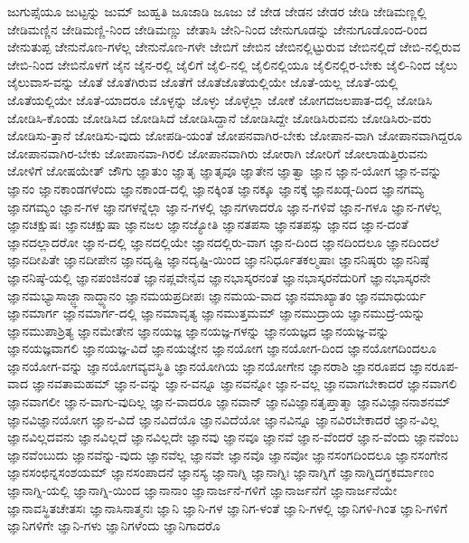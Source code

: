 {ಜುಗುಪ್ಸೆಯೂ
ಜುಟ್ಟನ್ನು
ಜುಮ್
ಜುಹ್ವತಿ
ಜೂಜಾಡಿ
ಜೂಜು
ಜೆ
ಜೇಡ
ಜೇಡನ
ಜೇಡರ
ಜೇಡಿ
ಜೇಡಿಮಣ್ಣಲ್ಲಿ
ಜೇಡಿಮಣ್ಣಿನ
ಜೇಡಿಮಣ್ಣಿ-ನಿಂದ
ಜೇಡಿಮಣ್ಣು
ಜೇತಾಸಿ
ಜೇನಿ-ನಿಂದ
ಜೇನುಗೂಡನ್ನು
ಜೇನುಗೂಡೊಂದ-ರಿಂದ
ಜೇನುತುಪ್ಪ
ಜೇನುನೊಣ-ಗಳೆಲ್ಲ
ಜೇನುನೊಣ-ಗಳೇ
ಜೇಬಿಗೆ
ಜೇಬಿನ
ಜೇಬಿನಲ್ಲಿಟ್ಟುರುವ
ಜೇಬಿನಲ್ಲಿದೆ
ಜೇಬಿ-ನಲ್ಲಿರುವ
ಜೇಬಿ-ನಿಂದ
ಜೇಬಿನೊಳಗೆ
ಜೈನ
ಜೈನ-ರಲ್ಲಿ
ಜೈಲಿಗೆ
ಜೈಲಿ-ನಲ್ಲಿ
ಜೈಲಿನಲ್ಲಿಯೂ
ಜೈಲಿನಲ್ಲಿರ-ಬೇಕು
ಜೈಲಿ-ನಿಂದ
ಜೈಲು
ಜೈಲುವಾಸ-ವನ್ನು
ಜೊತೆ
ಜೊತೆಗಿರುವ
ಜೊತೆಗೆ
ಜೊತೆಜೊತೆಯಲ್ಲಿಯೇ
ಜೊತೆ-ಯಲ್ಲ
ಜೊತೆ-ಯಲ್ಲಿ
ಜೊತೆಯಲ್ಲಿಯೇ
ಜೊತೆ-ಯಾದರೂ
ಜೊಳ್ಳನ್ನು
ಜೊಳ್ಳು
ಜೊಳ್ಳೆಲ್ಲಾ
ಜೋಕೆ
ಜೋಗದಜಲಪಾತ-ದಲ್ಲಿ
ಜೋಡಿಸಿ
ಜೋಡಿಸಿ-ಕೊಂಡು
ಜೋಡಿಸಿದ
ಜೋಡಿಸಿದೆ
ಜೋಡಿಸಿದ್ದಾನೆ
ಜೋಡಿಸಿದ್ದೇ
ಜೋಡಿಸಿರುವನು
ಜೋಡಿಸಿರು-ವರು
ಜೋಡಿಸು-ತ್ತಾನೆ
ಜೋಡಿಸು-ವುದು
ಜೋಪಡಿ-ಯಂತೆ
ಜೋಪನವಾಗಿರ-ಬೇಕು
ಜೋಪಾನ-ವಾಗಿ
ಜೋಪಾನವಾಗಿದ್ದರೂ
ಜೋಪಾನವಾಗಿರ-ಬೇಕು
ಜೋಪಾನವಾ-ಗಿರಲಿ
ಜೋಪಾನವಾಗಿರು
ಜೋರಾಗಿ
ಜೋರಿಗೆ
ಜೋಲಾಡುತ್ತಿರುವನು
ಜೋಳಿಗೆ
ಜೋಷಯೇತ್
ಜೌಗು
ಜ್ಞಾತುಂ
ಜ್ಞಾತೃ
ಜ್ಞಾತೃವೂ
ಜ್ಞಾತೇನ
ಜ್ಞಾತ್ವಾ
ಜ್ಞಾನ
ಜ್ಞಾನ-ಯೋಗ
ಜ್ಞಾನ-ವನ್ನು
ಜ್ಞಾನಂ
ಜ್ಞಾನಕಾಂಡಗಳೆಂದು
ಜ್ಞಾನಕಾಂಡ-ದಲ್ಲಿ
ಜ್ಞಾನಕ್ಕಿಂತ
ಜ್ಞಾನಕ್ಕೂ
ಜ್ಞಾನಕ್ಕೆ
ಜ್ಞಾನಖಡ್ಗ-ದಿಂದ
ಜ್ಞಾನಗಮ್ಯ
ಜ್ಞಾನಗಮ್ಯಂ
ಜ್ಞಾನ-ಗಳ
ಜ್ಞಾನಗಳನ್ನೆಲ್ಲಾ
ಜ್ಞಾನ-ಗಳಲ್ಲಿ
ಜ್ಞಾನಗಳಾದರೊ
ಜ್ಞಾನ-ಗಳಿವೆ
ಜ್ಞಾನ-ಗಳೂ
ಜ್ಞಾನ-ಗಳೆಲ್ಲ
ಜ್ಞಾನಚಕ್ಷುಷಃ
ಜ್ಞಾನಚಕ್ಷುಷಾ
ಜ್ಞಾನಜಲ
ಜ್ಞಾನಜ್ಯೋತಿ
ಜ್ಞಾನತಪಸಾ
ಜ್ಞಾನತಪಸ್ಸು
ಜ್ಞಾನದ
ಜ್ಞಾನ-ದಂತೆ
ಜ್ಞಾನದಲ್ಲಾದರೋ
ಜ್ಞಾನ-ದಲ್ಲಿ
ಜ್ಞಾನದಲ್ಲಿಯೇ
ಜ್ಞಾನದಲ್ಲಿರು-ವಾಗ
ಜ್ಞಾನ-ದಿಂದ
ಜ್ಞಾನದಿಂದಲೂ
ಜ್ಞಾನದಿಂದಲೆ
ಜ್ಞಾನದೀಪಿತೇ
ಜ್ಞಾನದೀಪೇನ
ಜ್ಞಾನದೃಷ್ಟಿ
ಜ್ಞಾನದೃಷ್ಟಿ-ಯಿಂದ
ಜ್ಞಾನನಿರ್ಧೂತಕಲ್ಮಷಾಃ
ಜ್ಞಾನನಿಷ್ಠರು
ಜ್ಞಾನನಿಷ್ಠೆ
ಜ್ಞಾನನಿಷ್ಠೆ-ಯಲ್ಲಿ
ಜ್ಞಾನಪಂಜಿನಂತೆ
ಜ್ಞಾನಪ್ಲವೇನೈವ
ಜ್ಞಾನಭಾಸ್ಕರನಂತೆ
ಜ್ಞಾನಭಾಸ್ಕರನೆದುರಿಗೆ
ಜ್ಞಾನಭಾಸ್ಕರನೇ
ಜ್ಞಾನಮಭ್ಯಾಸಾಜ್ಜ್ಞಾನಾದ್ಧ್ಯಾನಂ
ಜ್ಞಾನಮಯಪ್ರದೀಪಃ
ಜ್ಞಾನಮಯ-ವಾದ
ಜ್ಞಾನಮಾಖ್ಯಾತಂ
ಜ್ಞಾನಮಾಧುರ್ಯ
ಜ್ಞಾನಮಾರ್ಗ
ಜ್ಞಾನಮಾರ್ಗ-ದಲ್ಲಿ
ಜ್ಞಾನಮಾವೃತ್ಯ
ಜ್ಞಾನಮುತ್ತಮಮ್
ಜ್ಞಾನಮುದ್ರಾಯ
ಜ್ಞಾನಮುದ್ರೆ-ಯನ್ನು
ಜ್ಞಾನಮುಪಾಶ್ರಿತ್ಯ
ಜ್ಞಾನಮೇತೇನ
ಜ್ಞಾನಯಜ್ಞ
ಜ್ಞಾನಯಜ್ಞ-ಗಳನ್ನು
ಜ್ಞಾನಯಜ್ಞದ
ಜ್ಞಾನಯಜ್ಞ-ವನ್ನು
ಜ್ಞಾನಯಜ್ಞವಾಗಲಿ
ಜ್ಞಾನಯಜ್ಞ-ವಿದೆ
ಜ್ಞಾನಯಜ್ಞೇನ
ಜ್ಞಾನಯೋಗ
ಜ್ಞಾನಯೋಗ-ದಿಂದ
ಜ್ಞಾನಯೋಗದಿಂದಲೂ
ಜ್ಞಾನಯೋಗ-ವನ್ನು
ಜ್ಞಾನಯೋಗವ್ಯವಸ್ಥಿತಿ
ಜ್ಞಾನಯೋಗಿಯ
ಜ್ಞಾನಯೋಗೇನ
ಜ್ಞಾನರಾಶಿ
ಜ್ಞಾನರೂಪದ
ಜ್ಞಾನರೂಪ-ವಾದ
ಜ್ಞಾನವತಾಮಹಮ್
ಜ್ಞಾನ-ವನ್ನು
ಜ್ಞಾನ-ವನ್ನೂ
ಜ್ಞಾನವನ್ನೋ
ಜ್ಞಾನ-ವಲ್ಲ
ಜ್ಞಾನವಾಗಬೇಕಾದರೆ
ಜ್ಞಾನವಾಗಲಿ
ಜ್ಞಾನವಾಗಲೀ
ಜ್ಞಾನ-ವಾಗು-ವುದಿಲ್ಲ
ಜ್ಞಾನ-ವಾದರೂ
ಜ್ಞಾನವಾನ್
ಜ್ಞಾನವಿಜ್ಞಾನತೃಪ್ತಾತ್ಮಾ
ಜ್ಞಾನವಿಜ್ಞಾನನಾಶನಮ್
ಜ್ಞಾನವಿಜ್ಞಾನಯೋಗ
ಜ್ಞಾನ-ವಿದೆ
ಜ್ಞಾನವಿದೆಯೊ
ಜ್ಞಾನವಿದೆಯೋ
ಜ್ಞಾನವಿನ್ನೂ
ಜ್ಞಾನವಿರಬೇಕಾದರೆ
ಜ್ಞಾನ-ವಿಲ್ಲ
ಜ್ಞಾನವಿಲ್ಲದವನು
ಜ್ಞಾನವಿಲ್ಲದೆ
ಜ್ಞಾನವಿಲ್ಲದೇ
ಜ್ಞಾನವು
ಜ್ಞಾನವೂ
ಜ್ಞಾನವೆ
ಜ್ಞಾನ-ವೆಂದರೆ
ಜ್ಞಾನ-ವೆಂದು
ಜ್ಞಾನವೆಂಬ
ಜ್ಞಾನವೆಂಬುದು
ಜ್ಞಾನವೆನ್ನು-ವುದು
ಜ್ಞಾನವೆಲ್ಲ
ಜ್ಞಾನವೇ
ಜ್ಞಾನವೊ
ಜ್ಞಾನವೋ
ಜ್ಞಾನಸಂಗದಿಂದಲೂ
ಜ್ಞಾನಸಂಗೇನ
ಜ್ಞಾನಸಂಛಿನ್ನಸಂಶಯಮ್
ಜ್ಞಾನಸಂಪಾದನೆ
ಜ್ಞಾನಸ್ಯ
ಜ್ಞಾನಾಗ್ನಿ
ಜ್ಞಾನಾಗ್ನಿಃ
ಜ್ಞಾನಾಗ್ನಿಗೆ
ಜ್ಞಾನಾಗ್ನಿದಗ್ಧಕರ್ಮಾಣಂ
ಜ್ಞಾನಾಗ್ನಿ-ಯಲ್ಲಿ
ಜ್ಞಾನಾಗ್ನಿ-ಯಿಂದ
ಜ್ಞಾನಾನಾಂ
ಜ್ಞಾನಾರ್ಜನೆ-ಗಳಿಗೆ
ಜ್ಞಾನಾರ್ಜನೆಗೆ
ಜ್ಞಾನಾರ್ಜನೆಯೇ
ಜ್ಞಾನಾವಸ್ಥಿತಚೇತಸಃ
ಜ್ಞಾನಾಸಿನಾತ್ಮನಃ
ಜ್ಞಾನಿ
ಜ್ಞಾನಿ-ಗಳ
ಜ್ಞಾನಿಗ-ಳಂತೆ
ಜ್ಞಾನಿ-ಗಳಲ್ಲಿ
ಜ್ಞಾನಿಗಳಿ-ಗಿಂತ
ಜ್ಞಾನಿ-ಗಳಿಗೆ
ಜ್ಞಾನಿಗಳಿಗೇ
ಜ್ಞಾನಿ-ಗಳು
ಜ್ಞಾನಿಗಳೆಂದು
ಜ್ಞಾನಿಗಾದರೊ
}
